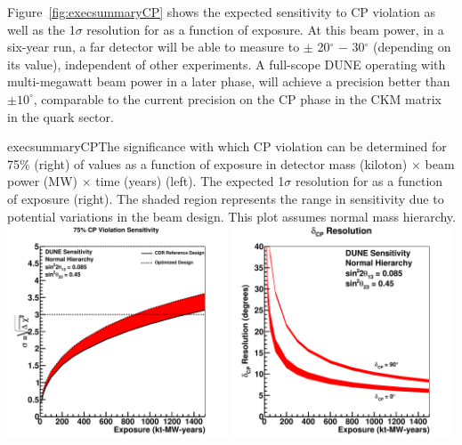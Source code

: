 Figure~\ref{fig:execsummaryCP} shows the expected sensitivity to CP
violation as well as the 1$\sigma$ resolution for \deltacp as a
function of exposure.  At this beam power, in a six-year run, a
 far detector will be able to measure \deltacp to $\pm$
20$^\circ$ $-$ 30$^\circ$ (depending on its value), independent of
other experiments.
A full-scope %
DUNE operating with multi-megawatt 
beam power in a later phase, will achieve a precision better than $\pm
10^\circ$, comparable to the current precision on the CP phase in the
CKM matrix in the quark sector.
%
\begin{cdrfigure}{execsummaryCP}{The
    significance with which CP violation can be determined for 75\%
    (right) of \deltacp values as a function of exposure in detector
    mass (kiloton) $\times$ beam power (MW) $\times$ time (years)
    (left). The expected 1$\sigma$ resolution for \deltacp as a
    function of exposure (right). The shaded region represents the
    range in sensitivity due to potential variations in the beam
    design. This plot assumes normal mass hierarchy.}
\includegraphics[width=0.49\textwidth]{volume-physics/figures/cpv75_exp}
 \includegraphics[width=0.49\textwidth]{volume-physics/figures/res_dcp_exp}
\end{cdrfigure}

